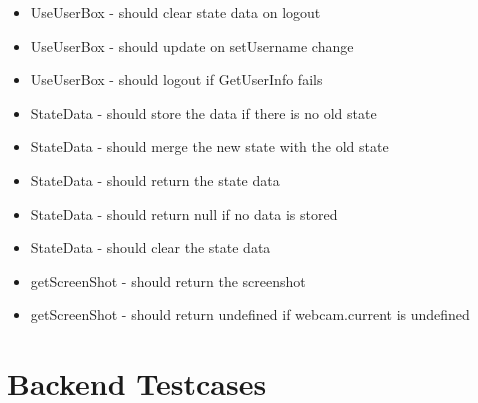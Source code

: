 \begin{multicols}{1}
\begin{itemize}
\item UseUserBox - should clear state data on logout
\item UseUserBox - should update on setUsername change
\item UseUserBox - should logout if GetUserInfo fails
\item StateData - should store the data if there is no old state
\item StateData - should merge the new state with the old state
\item StateData - should return the state data
\item StateData - should return null if no data is stored
\item StateData - should clear the state data
\item getScreenShot - should return the screenshot
\item getScreenShot - should return undefined if webcam.current is undefined
    \end{itemize}
\end{multicols}

\section{Backend Testcases} \label{sec:backend_testcases}
